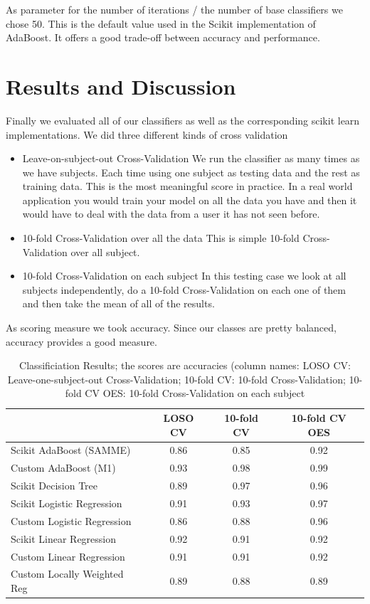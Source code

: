 \documentclass[12pt, a4paper, onecolumn, oneside, parskip=half]{scrartcl}
\begin{document}
As parameter for the number of iterations / the number of base classifiers we chose 50. This is the default value used in the Scikit implementation of AdaBoost. It offers a good trade-off between accuracy and performance.


\section{Results and Discussion}

Finally we evaluated all of our classifiers as well as the corresponding scikit learn implementations. We did three different kinds of cross validation
\begin{itemize}
\item Leave-on-subject-out Cross-Validation \newline
We run the classifier as many times as we have subjects. Each time using one subject as testing data and the rest as training data. This is the most meaningful score in practice. In a real world application you would train your model on all the data you have and then it would have to deal with the data from a user it has not seen before.
\item 10-fold Cross-Validation over all the data\newline
This is simple 10-fold Cross-Validation over all subject.
\item 10-fold Cross-Validation on each subject\newline
In this testing case we look at all subjects independently, do a 10-fold Cross-Validation on each one of them and then take the mean of all of the results.
\end{itemize}

As scoring measure we took accuracy. Since our classes are pretty balanced, accuracy provides a good measure.

\begin{table}
  \begin{tabular}{ l | c | c | c }
     & LOSO CV & 10-fold CV & 10-fold CV OES  \\ \hline
    Scikit AdaBoost (SAMME) & 0.86 & 0.85 & 0.92 \\ \hline
    Custom AdaBoost (M1) & 0.93 & 0.98 & 0.99 \\ \hline
    Scikit Decision Tree & 0.89 & 0.97 & 0.96 \\ \hline
    Scikit Logistic Regression & 0.91 & 0.93 & 0.97 \\ \hline
    Custom Logistic Regression & 0.86 & 0.88 & 0.96 \\ \hline
    Scikit Linear Regression & 0.92 & 0.91 & 0.92 \\ \hline
    Custom Linear Regression & 0.91 & 0.91 & 0.92 \\ \hline
    Custom Locally Weighted Reg & 0.89 & 0.88 & 0.89 \\ \hline
  \end{tabular}
  \caption{Classificiation Results; the scores are accuracies (column names: LOSO CV: Leave-one-subject-out Cross-Validation; 10-fold CV: 10-fold Cross-Validation; 10-fold CV OES: 10-fold Cross-Validation on each subject \label{results-table}}
\end{table}
\end{document}
